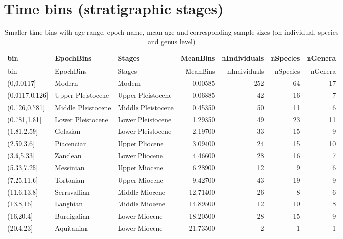 \section{Time bins (stratigraphic
stages)}\label{time-bins-stratigraphic-stages}

\begin{longtable}[]{@{}lllrrrr@{}}
\caption{Smaller time bins with age range, epoch name, mean age and
corresponding sample sizes (on individual, species and genus
level)}
\label{tab:bins}\tabularnewline
\toprule
bin & EpochBins & Stages & MeanBins & nIndividuals & nSpecies &
nGenera\tabularnewline
\midrule
\endfirsthead
\toprule
bin & EpochBins & Stages & MeanBins & nIndividuals & nSpecies &
nGenera\tabularnewline
\midrule
\endhead
(0,0.0117{]} & Modern & Modern & 0.00585 & 252 & 64 & 17\tabularnewline
(0.0117,0.126{]} & Upper Pleistocene & Upper Pleistocene & 0.06885 & 42
& 16 & 7\tabularnewline
(0.126,0.781{]} & Middle Pleistocene & Middle Pleistocene & 0.45350 & 50
& 11 & 6\tabularnewline
(0.781,1.81{]} & Lower Pleistocene & Lower Pleistocene & 1.29350 & 49 &
23 & 11\tabularnewline
(1.81,2.59{]} & Gelasian & Lower Pleistocene & 2.19700 & 33 & 15 &
9\tabularnewline
(2.59,3.6{]} & Piacencian & Upper Pliocene & 3.09400 & 24 & 15 &
10\tabularnewline
(3.6,5.33{]} & Zanclean & Lower Pliocene & 4.46600 & 28 & 16 &
7\tabularnewline
(5.33,7.25{]} & Messinian & Upper Miocene & 6.28900 & 12 & 9 &
6\tabularnewline
(7.25,11.6{]} & Tortonian & Upper Miocene & 9.42700 & 43 & 19 &
9\tabularnewline
(11.6,13.8{]} & Serravallian & Middle Miocene & 12.71400 & 26 & 8 &
6\tabularnewline
(13.8,16{]} & Langhian & Middle Miocene & 14.89500 & 12 & 10 &
8\tabularnewline
(16,20.4{]} & Burdigalian & Lower Miocene & 18.20500 & 28 & 15 &
9\tabularnewline
(20.4,23{]} & Aquitanian & Lower Miocene & 21.73500 & 2 & 1 &
1\tabularnewline
\bottomrule
\end{longtable}
